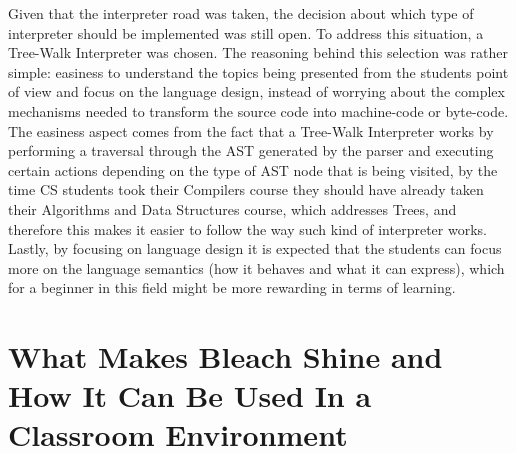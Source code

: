 \begin{itemize}
\begin{itemize}
        Given that the interpreter road was taken, the decision about which type of interpreter should be implemented was still open. To address this situation, a Tree-Walk Interpreter was chosen. The reasoning behind this selection was rather simple: easiness to understand the topics being presented from the students point of view and focus on the language design, instead of worrying about the complex mechanisms needed to transform the source code into machine-code or byte-code. The easiness aspect comes from the fact that a Tree-Walk Interpreter works by performing a traversal through the AST generated by the parser and executing certain actions depending on the type of AST node that is being visited, by the time CS students took their Compilers course they should have already taken their Algorithms and Data Structures course, which addresses Trees, and therefore this makes it easier to follow the way such kind of interpreter works. Lastly, by focusing on language design it is expected that the students can focus more on the language semantics (how it behaves and what it can express), which for a beginner in this field might be more rewarding in terms of learning.

        
    \end{itemize}
\end{itemize}


\section{What Makes Bleach Shine and How It Can Be Used In a Classroom Environment}
